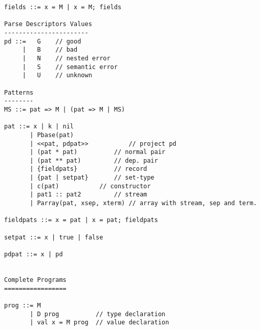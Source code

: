 \begin{verbatim}
fields ::= x = M | x = M; fields

Parse Descriptors Values
-----------------------
pd ::=   G    // good
     |   B    // bad
     |   N    // nested error
     |   S    // semantic error
     |   U    // unknown

Patterns
--------
MS ::= pat => M | (pat => M | MS)

pat ::= x | k | nil
       | Pbase(pat)
       | <<pat, pdpat>>           // project pd
       | (pat * pat)		  // normal pair
       | (pat ** pat)		  // dep. pair
       | {fieldpats}		  // record
       | {pat | setpat}		  // set-type
       | c(pat)			  // constructor
       | pat1 :: pat2		  // stream
       | Parray(pat, xsep, xterm) // array with stream, sep and term.

fieldpats ::= x = pat | x = pat; fieldpats

setpat ::= x | true | false

pdpat ::= x | pd


Complete Programs
=================

prog ::= M              
       | D prog          // type declaration
       | val x = M prog  // value declaration
\end{verbatim}


